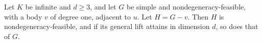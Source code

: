\begin{lemma}
  \label{lem:pencil-d-lift-pendant}
  \leanok
  Let $K$ be infinite and $d \ge 3$, and let $G$ be simple and
  nondegeneracy-feasible, with a body $v$ of degree one, adjacent to $u$.
  Let $H = G - v$. Then $H$ is nondegeneracy-feasible, and if its general
  lift attains in dimension $d$, so does that of $G$.
\end{lemma}
